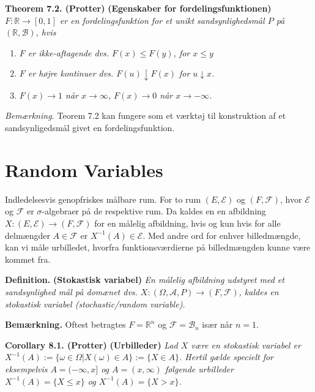 \documentclass[a4paper,12pt,openany]{book}
\providecommand{\tightlist}{%
 \setlength{\itemsep}{0pt}\setlength{\parskip}{0pt}}
\begin{document}
\textbf{Theorem 7.2. (Protter)} \textbf{(Egenskaber for fordelingsfunktionen)} \emph{\(F : \mathbb{R} \to [0,1]\) er en fordelingsfunktion for et unikt sandsynlighedsmål \(P\) på \((\mathbb{R},\mathcal{B})\), hvis}

\begin{enumerate}
\def\labelenumi{\roman{enumi}.}
\tightlist
\item
  \emph{\(F\) er ikke-aftagende dvs. \(F(x)\le F(y)\), for \(x\le y\)}
\item
  \emph{\(F\) er højre kontinuer dvs. \(F(u)\downarrow F(x)\) for \(u\downarrow x\).}
\item
  \emph{\(F(x)\to 1\) når \(x\to \infty\), \(F(x)\to 0\) når \(x\to -\infty\).}
\end{enumerate}

\emph{Bemærkning.} Teorem 7.2 kan fungere som et værktøj til konstruktion af et sandsynligedsmål givet en fordelingsfunktion.

\hypertarget{random-variables}{%
\section{Random Variables}\label{random-variables}}

Indledelsesvis genopfriskes målbare rum. For to rum \((E,\mathcal{E})\) og \((F,\mathcal{F})\), hvor \(\mathcal{E}\) og \(\mathcal{F}\) er \(\sigma\)-algebraer på de respektive rum. Da kaldes en en afbildning \(X : (E,\mathcal{E})\to(F,\mathcal{F})\) for en målelig afbildning, hvis og kun hvis for alle delmængder \(A\in\mathcal{F}\) er \(X^{-1}(A)\in\mathcal{E}\). Med andre ord for enhver billedmængde, kan vi måle urbilledet, hvorfra funktionsværdierne på billedmængden kunne være kommet fra.

\textbf{Definition.} \textbf{(Stokastisk variabel)} \emph{En målelig afbildning udstyret med et sandsynlighed mål på domænet dvs. \(X : (\Omega,\mathcal{A},P) \to (F,\mathcal{F})\), kaldes en stokastisk variabel (stochastic/random variable).}

\textbf{Bemærkning.} Oftest betragtes \(F=\mathbb{R}^n\) og \(\mathcal{F}=\mathcal{B}_n\) især når \(n=1\).

\textbf{Corollary 8.1. (Protter)} \textbf{(Urbilleder)} \emph{Lad \(X\) være en stokastisk variabel er \(X^{-1}(A):=\{\omega\in\Omega \vert X(\omega)\in A\}:=\{X\in A\}\). Hertil gælde specielt for eksempelvis \(A=(-\infty,x]\) og \(A=(x,\infty)\) følgende urbilleder \(X^{-1}(A)=\{X\le x\}\) og \(X^{-1}(A)=\{X> x\}\).}
\end{document}
